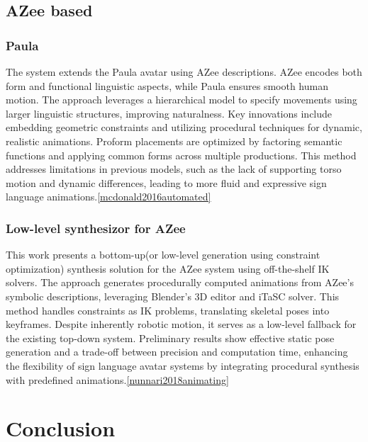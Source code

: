 \documentclass[../../main.tex]{subfiles}
\begin{document}
\subsection{AZee based}

\subsubsection{Paula}

The system extends the Paula\cite{azee-paula} avatar using AZee descriptions. AZee encodes both form and functional linguistic aspects, while Paula ensures smooth human motion. The approach leverages a hierarchical model to specify movements using larger linguistic structures, improving naturalness. Key innovations include embedding geometric constraints and utilizing procedural techniques for dynamic, realistic animations. Proform placements are optimized by factoring semantic functions and applying common forms across multiple productions. This method addresses limitations in previous models, such as the lack of supporting torso motion and dynamic differences, leading to more fluid and expressive sign language animations.\ref{mcdonald2016automated}

\subsubsection{Low-level synthesizor for AZee}

This work presents a bottom-up(or low-level generation using constraint optimization) synthesis solution for the AZee system using off-the-shelf IK solvers. The approach generates procedurally computed animations from AZee's symbolic descriptions, leveraging Blender's 3D editor and iTaSC solver. This method handles constraints as IK problems, translating skeletal poses into keyframes. Despite inherently robotic motion, it serves as a low-level fallback for the existing top-down system. Preliminary results show effective static pose generation and a trade-off between precision and computation time, enhancing the flexibility of sign language avatar systems by integrating procedural synthesis with predefined animations.\ref{nunnari2018animating}

\section{Conclusion}
\end{document}
